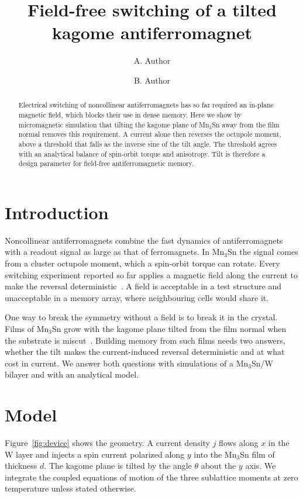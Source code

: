 \documentclass[twocolumn,10pt]{article}
\title{Field-free switching of a tilted kagome antiferromagnet}
\author{A. Author \and B. Author}
\date{}
\begin{document}
\maketitle

\begin{abstract}
Electrical switching of noncollinear antiferromagnets has so far required an in-plane magnetic field, which
blocks their use in dense memory. Here we show by micromagnetic simulation that tilting the kagome plane of
Mn$_3$Sn away from the film normal removes this requirement. A current alone then reverses the octupole
moment, above a threshold that falls as the inverse sine of the tilt angle. The threshold agrees with an
analytical balance of spin-orbit torque and anisotropy. Tilt is therefore a design parameter for field-free
antiferromagnetic memory.
\end{abstract}

\section{Introduction}

Noncollinear antiferromagnets combine the fast dynamics of antiferromagnets with a readout signal as large
as that of ferromagnets. In Mn$_3$Sn the signal comes from a cluster octupole moment, which a spin-orbit
torque can rotate. Every switching experiment reported so far applies a magnetic field along the current to
make the reversal deterministic~\cite{A,B}. A field is acceptable in a test structure and unacceptable in a
memory array, where neighbouring cells would share it.

One way to break the symmetry without a field is to break it in the crystal. Films of Mn$_3$Sn grow with
the kagome plane tilted from the film normal when the substrate is miscut~\cite{C}. Building memory from such films
needs two answers, whether the tilt makes the current-induced reversal deterministic and at what cost in
current. We answer both questions with simulations of a Mn$_3$Sn/W bilayer and with an analytical model.

\section{Model}

Figure~\ref{fig:device} shows the geometry. A current density $j$ flows along $x$ in the W layer and injects
a spin current polarized along $y$ into the Mn$_3$Sn film of thickness $d$. The kagome plane is tilted by
the angle $\theta$ about the $y$ axis. We integrate the coupled equations of motion of the three sublattice
moments at zero temperature unless stated otherwise.
\end{document}
